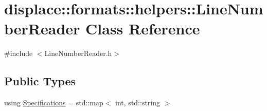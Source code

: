 \hypertarget{classdisplace_1_1formats_1_1helpers_1_1_line_number_reader}{}\section{displace\+::formats\+::helpers\+::Line\+Number\+Reader Class Reference}
\label{classdisplace_1_1formats_1_1helpers_1_1_line_number_reader}


{\ttfamily \#include $<$Line\+Number\+Reader.\+h$>$}

\subsection*{Public Types}
\begin{DoxyCompactItemize}
\item 
using \mbox{\hyperlink{classdisplace_1_1formats_1_1helpers_1_1_line_number_reader_abe3e6baa5d73748c82d6c428e157e4b2}{Specifications}} = std\+::map$<$ int, std\+::string $>$
\end{DoxyCompactItemize}
